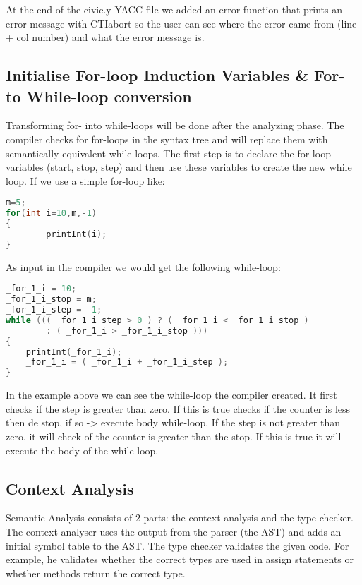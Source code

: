 \documentclass[hidelinks]{uva-inf-article}
\begin{document}
At the end of the civic.y YACC file we added an error function that prints an error message
with CTIabort so the user can see where the error came from (line + col number) and what
the error message is. 

\subsection{Initialise For-loop Induction Variables \& For- to While-loop conversion}
Transforming for- into while-loops will be done after the analyzing phase. The compiler checks
for for-loops in the syntax tree and will replace them with semantically equivalent while-loops.
The first step is to declare the for-loop variables (start, stop, step) and then use these 
variables to create the new while loop. If we use a simple for-loop like:

\begin{lstlisting}[basicstyle=\small, language=C, label=lst:code, caption=For-loop example, captionpos=b]
m=5;
for(int i=10,m,-1)
{
        printInt(i);
}
\end{lstlisting}

\newpage
As input in the compiler we would get the following while-loop:

\begin{lstlisting}[basicstyle=\small, language=C, label=lst:code, caption=While-loop example, captionpos=b]
_for_1_i = 10;
_for_1_i_stop = m;
_for_1_i_step = -1;
while ((( _for_1_i_step > 0 ) ? ( _for_1_i < _for_1_i_stop ) 
        : ( _for_1_i > _for_1_i_stop )))
{
    printInt(_for_1_i);
    _for_1_i = ( _for_1_i + _for_1_i_step );
}
\end{lstlisting}

In the example above we can see the while-loop the compiler created. It first checks if the step is greater
than zero. If this is true checks if the counter is less then de stop, if so -> execute body while-loop. If
the step is not greater than zero, it will check of the counter is greater than the stop. If this is true it 
will execute the body of the while loop.

\subsection{Context Analysis}
Semantic Analysis consists of 2 parts: the context analysis and the type checker. The context
analyser uses the output from the parser (the AST) and adds an initial symbol table to the AST.
The type checker validates the given code. For example, he validates whether the correct 
types are used in assign statements or whether methods return the correct type.
\end{document}
